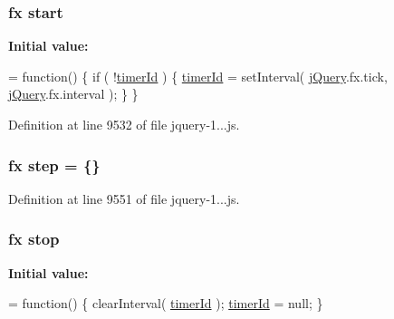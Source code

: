\subsubsection[{start}]{ {\bf fx} start}\label{_scripts_2jquery-1_810_82_8js_aef10902ffededd983608fdb8dbfc441a}
{\bfseries Initial value\+:}
\begin{DoxyCode}
= \textcolor{keyword}{function}() \{
    \textcolor{keywordflow}{if} ( !\hyperlink{obj_2_release_2_package_2_package_tmp_2_scripts_2jquery-1_810_82_8js_aa447439fbe7027e58837a297297c9d8a}{timerId} ) \{
        \hyperlink{obj_2_release_2_package_2_package_tmp_2_scripts_2jquery-1_810_82_8js_aa447439fbe7027e58837a297297c9d8a}{timerId} = setInterval( \hyperlink{obj_2_release_2_package_2_package_tmp_2_scripts_2jquery-1_810_82_8js_a41c2e1bff4a6b292938143764e31d789}{jQuery}.fx.tick, \hyperlink{obj_2_release_2_package_2_package_tmp_2_scripts_2jquery-1_810_82_8js_a41c2e1bff4a6b292938143764e31d789}{jQuery}.fx.interval );
    \}
\}
\end{DoxyCode}


Definition at line 9532 of file jquery-\/1...\+js.

\hypertarget{_scripts_2jquery-1_810_82_8js_a7337229078e935a813e7e0f674fad739}{}
\subsubsection[{step}]{ {\bf fx} step = \{\}}\label{_scripts_2jquery-1_810_82_8js_a7337229078e935a813e7e0f674fad739}


Definition at line 9551 of file jquery-\/1...\+js.

\hypertarget{_scripts_2jquery-1_810_82_8js_ac9a544302040b74e845b33c285cd10e7}{}
\subsubsection[{stop}]{ {\bf fx} stop}\label{_scripts_2jquery-1_810_82_8js_ac9a544302040b74e845b33c285cd10e7}
{\bfseries Initial value\+:}
\begin{DoxyCode}
= \textcolor{keyword}{function}() \{
    clearInterval( \hyperlink{obj_2_release_2_package_2_package_tmp_2_scripts_2jquery-1_810_82_8js_aa447439fbe7027e58837a297297c9d8a}{timerId} );
    \hyperlink{obj_2_release_2_package_2_package_tmp_2_scripts_2jquery-1_810_82_8js_aa447439fbe7027e58837a297297c9d8a}{timerId} = null;
\}
\end{DoxyCode}


